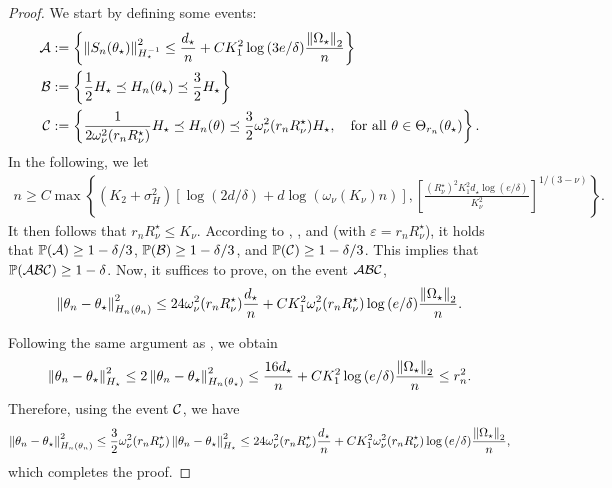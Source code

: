 \begin{proof}
    We start by defining some events:
    \begin{align}\label{eq:def_events}
        \begin{split}
            \mathcal{A} &:= \left\{ \left\lVert S_n(\theta_\star) \right\rVert_{H_\star^{-1}}^{2} \le \frac{d_\star}n + C K_{1}^2 \log{(3e / \delta)} \frac{\left\lVert \Omega_\star \right\rVert_2}{n} \right\} \\
            \mathcal{B} &:= \left\{ \frac12 H_\star \preceq H_n(\theta_\star) \preceq \frac32 H_\star \right\} \\
            \mathcal{C} &:= \left\{ \frac1{2 \omega_\nu^2(r_n R_\nu^\star)} H_\star \preceq H_n(\theta) \preceq \frac{3}{2} \omega_\nu^2(r_n R_\nu^\star) H_\star, \quad \mbox{for all } \theta \in \Theta_{r_n}(\theta_\star) \right\}.
        \end{split}
    \end{align}
    In the following, we let
    \begin{align*}
        n \ge C \max\left\{(K_2 + \sigma_H^2)\left[\log(2d/\delta) + d\log{(\omega_{\nu}(K_\nu) n)} \right], \left[ \frac{(R_\nu^\star)^2 K_1^2 d_\star \log{(e/\delta)}}{K_\nu^2} \right]^{1/(3-\nu)} \right\}.
    \end{align*}
    It then follows that $r_n R_{\nu}^\star \le K_\nu$.
    According to , , and  (with $\varepsilon = r_n R_\nu^\star$), it holds that $\operatorname{\mathbb P}(\mathcal{A}) \ge 1 - \delta/3$, $\operatorname{\mathbb P}(\mathcal{B}) \ge 1 - \delta/3$, and $\operatorname{\mathbb P}(\mathcal{C}) \ge 1 - \delta/3$.
    This implies that $\operatorname{\mathbb P}(\mathcal{A} \mathcal{B} \mathcal{C}) \ge 1 - \delta$.
    Now, it suffices to prove, on the event $\mathcal{A} \mathcal{B} \mathcal{C}$,
    \begin{align*}
        \left\lVert \theta_n - \theta_\star \right\rVert_{H_n(\theta_n)}^2 \le 24 \omega_\nu^2(r_n R_\nu^\star) \frac{d_\star}{n} + C K_1^2 \omega_\nu^2(r_n R_\nu^\star) \log{(e/\delta)} \frac{\left\lVert \Omega_\star \right\rVert_2}{n}.
    \end{align*}
    
    Following the same argument as , we obtain
    \begin{align*}
        \left\lVert \theta_n - \theta_\star \right\rVert_{H_\star}^2
        \le 2\left\lVert \theta_n - \theta_\star \right\rVert_{H_n(\theta_\star)}^2
        \le \frac{16d_\star}{n} + CK_1^2 \log{(e/\delta)} \frac{\left\lVert \Omega_\star \right\rVert_2}{n}
        \le r_n^2.
    \end{align*}
    Therefore, using the event $\mathcal{C}$, we have
    \begin{align*}
        \left\lVert \theta_n - \theta_\star \right\rVert_{H_n(\theta_n)}^2
        \le \frac32 \omega_\nu^2(r_n R_\nu^\star) \left\lVert \theta_n - \theta_\star \right\rVert_{H_\star}^2
        \le 24 \omega_\nu^2(r_n R_\nu^\star) \frac{d_\star}{n} + C K_1^2 \omega_\nu^2(r_n R_\nu^\star) \log{(e/\delta)} \frac{\left\lVert \Omega_\star \right\rVert_2}{n},
    \end{align*}
    which completes the proof.
\end{proof}

